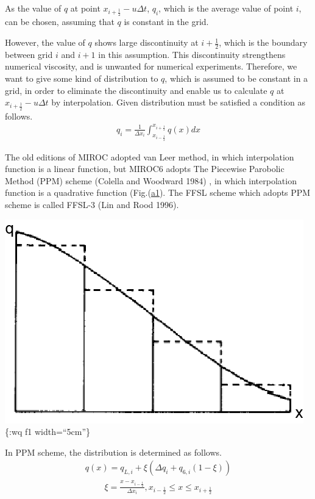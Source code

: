 As the value of \(q\) at point \(x_{i+\frac{1}{2}}-u\Delta t\), \(q_{i}\), which is the average value of point \(i\), can be chosen, assuming that \(q\) is constant in the grid.

However, the value of \(q\) shows large discontinuity at \(i+\frac{1}{2}\), which is the boundary between grid \(i\) and \(i+1\) in this assumption. This discontinuity strengthens numerical viscosity,
and is unwanted for numerical experiments. Therefore, we want to give some kind of distribution to \(q\), which is assumed to be constant in a grid, in order to eliminate the discontinuity and enable
us to calculate \(q\) at \(x_{i+\frac{1}{2}}-u\Delta t\) by interpolation. Given distribution must be satisfied a condition as follows.
\begin{eqnarray}q_{i}=\frac{1}{\Delta x_{i}} \int_{x_{i-\frac{1}{2}}}^{x_{i+\frac{1}{2}}} q(x) dx\end{eqnarray}

The old editions of MIROC adopted van Leer method, in which interpolation function is a linear function, but MIROC6 adopts The Piecewise Parobolic Method (PPM) scheme (Colella and Woodward 1984) , in
which interpolation function is a quadrative function (Fig.(\url{a1}). The FFSL scheme which adopts PPM scheme is called FFSL-3 (Lin and Rood 1996).

\includegraphics{../figures/ppm_interpolate.png}\{:wq f1 width=``5cm''\}

In PPM scheme, the distribution is determined as follows. \begin{eqnarray}
q(x)=q_{L, i}+\xi\left(\Delta q_{i}+q_{6, i}(1-\xi)\right)
\end{eqnarray} \begin{eqnarray}
\xi=\frac{x-x_{i-\frac{1}{2}}}{\Delta x_{i}}, x_{i-\frac{1}{2}} \leq x \leq x_{i+\frac{1}{2}}
\end{eqnarray}

